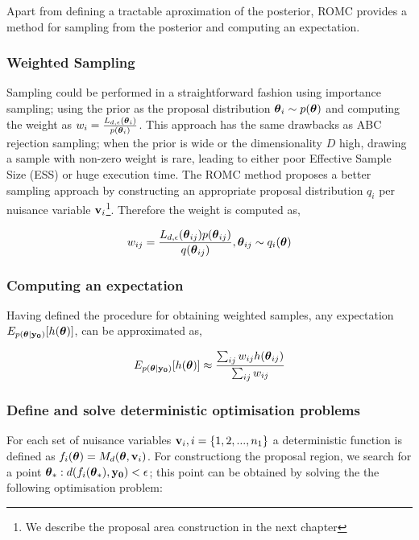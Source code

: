 Apart from defining a tractable aproximation of the posterior, ROMC
provides a method for sampling from the posterior and computing an expectation.

\subsubsection*{Weighted Sampling}

Sampling could be performed in a straightforward fashion using
importance sampling; using the prior as the proposal distribution
$\boldsymbol{\theta}_i \sim p(\boldsymbol{\theta})$ and computing the weight as
$w_i = \frac{L_{d,\epsilon}(\boldsymbol{\theta}_i)}{p(\boldsymbol{\theta}_i)}$. This approach
has the same drawbacks as ABC rejection sampling; when the prior is
wide or the dimensionality $D$ high, drawing a sample with non-zero
weight is rare, leading to either poor Effective Sample Size (ESS) or
huge execution time. The ROMC method proposes a better sampling
approach by constructing an appropriate proposal distribution $q_i$
per nuisance variable $\mathbf{v}_i$\footnote{We describe the proposal area
  construction in the next chapter}. Therefore the weight is computed
as,

\begin{equation} \label{eq:sampling}
  w_{ij} = \frac{L_{d,\epsilon}(\boldsymbol{\theta}_{ij}) p(\boldsymbol{\theta}_{ij})}{q(\boldsymbol{\theta}_{ij})}, \boldsymbol{\theta}_{ij} \sim q_i(\boldsymbol{\theta})
\end{equation}


\subsubsection*{Computing an expectation}

Having defined the procedure for obtaining weighted samples, any expectation $E_{p(\boldsymbol{\theta}|\mathbf{y_0})}[h(\boldsymbol{\theta})]$, can be approximated as,

\begin{equation} \label{eq:expectation}
  E_{p(\boldsymbol{\theta}|\mathbf{y_0})}[h(\boldsymbol{\theta})] \approx \frac{\sum_{ij} w_{ij} h(\boldsymbol{\theta}_{ij})}{\sum_{ij} w_{ij}}
\end{equation}

 
\subsubsection{Define and solve deterministic optimisation problems}

For each set of nuisance variables $\mathbf{v}_i, i = \{1,2,...,n_1 \}$ a deterministic function is defined as $f_i(\boldsymbol{\theta}) = M_d(\boldsymbol{\theta},\mathbf{v}_i)$. For constructiong the proposal region, we search for a point $\boldsymbol{\theta}_* : d(f_i(\boldsymbol{\theta}_*), \mathbf{y_0}) < \epsilon$; this point can be obtained by solving the the following optimisation problem:

